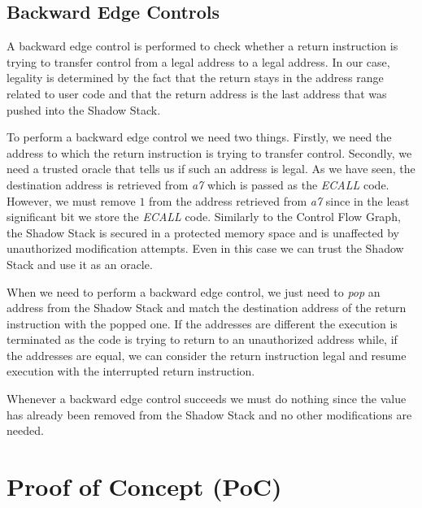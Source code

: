 \subsection{Backward Edge Controls}
\label{subsec:backward}

A backward edge control is performed to check whether a return instruction is
trying to transfer control from a legal address to a legal address. In our case,
legality is determined by the fact that the return stays in the address range
related to user code and that the return address is the last address that was
pushed into the Shadow Stack.

To perform a backward edge control we need two things. Firstly, we need the
address to which the return instruction is trying to transfer control. Secondly,
we need a trusted oracle that tells us if such an address is legal. As we have seen,
the destination address is retrieved from \textit{a7} which is passed as the \textit{ECALL}
code. However, we must remove $1$ from the address retrieved from \textit{a7} since
in the least significant bit we store the \textit{ECALL} code. Similarly to the Control
Flow Graph, the Shadow Stack is secured in a protected memory space and is
unaffected by unauthorized modification attempts. Even in this case we can trust
the Shadow Stack and use it as an oracle.

When we need to perform a backward edge control, we just need to \textit{pop} an
address from the Shadow Stack and match the destination address of the return instruction
with the popped one. If the addresses are different the execution is terminated
as the code is trying to return to an unauthorized address while, if the addresses
are equal, we can consider the return instruction legal and resume execution
with the interrupted return instruction.

Whenever a backward edge control succeeds we must do nothing since the value has
already been removed from the Shadow Stack and no other modifications are needed.

\section{Proof of Concept (PoC)}
\label{sec:project_poc}

